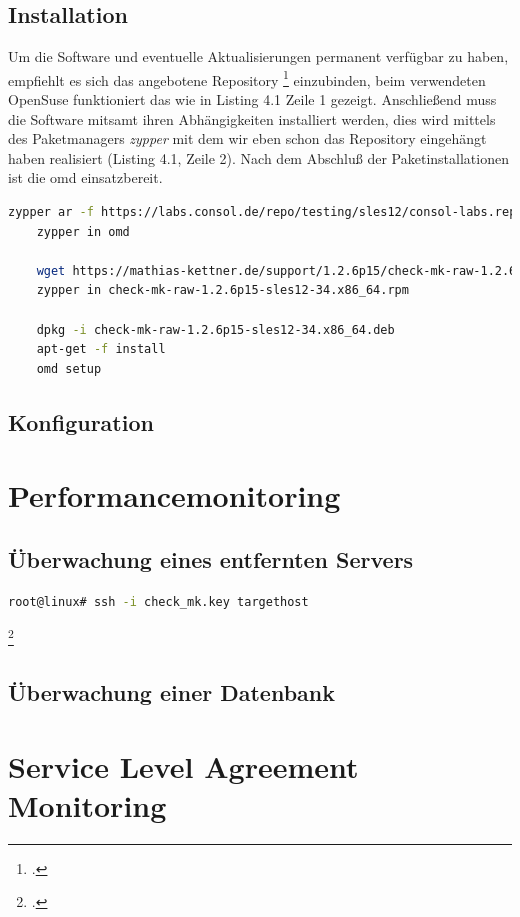 \documentclass[12pt,a4paper,parskip,listof=totoc,bibliography=totoc]{scrreprt}
\begin{document}
	\subsection{Installation}
	Um die Software und eventuelle Aktualisierungen permanent verfügbar zu haben, empfiehlt es sich das angebotene Repository \footcite{omdrepo} einzubinden, beim verwendeten OpenSuse funktioniert das wie in Listing 4.1 Zeile 1 gezeigt. Anschließend muss die Software mitsamt ihren Abhängigkeiten installiert werden, dies wird mittels des Paketmanagers \textit{zypper} mit dem wir eben schon das Repository eingehängt haben realisiert (Listing 4.1, Zeile 2). Nach dem Abschluß der Paketinstallationen ist die \acrshort{omd} einsatzbereit.
	\begin{lstlisting}[language=bash, caption=Konfiguration eines Repositories und Installation der \acrfull{omd}]
	zypper ar -f https://labs.consol.de/repo/testing/sles12/consol-labs.repo
	zypper in omd
	
	wget https://mathias-kettner.de/support/1.2.6p15/check-mk-raw-1.2.6p15-sles12-34.x86_64.rpm
	zypper in check-mk-raw-1.2.6p15-sles12-34.x86_64.rpm
	
	dpkg -i check-mk-raw-1.2.6p15-sles12-34.x86_64.deb
	apt-get -f install
	omd setup
	\end{lstlisting}
	\subsection{Konfiguration}
	
	\section{Performancemonitoring}
	\subsection{Überwachung eines entfernten Servers}
	\begin{lstlisting}[language=bash]
	root@linux# ssh -i check_mk.key targethost
	\end{lstlisting} \footcite{checkmkCheckBySSH2015}
	\subsection{Überwachung einer Datenbank}
	\section{Service Level Agreement Monitoring}
\end{document}
